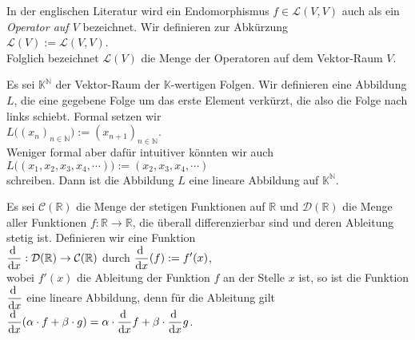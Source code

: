 In der englischen Literatur wird ein  Endomorphismus $f \in \mathcal{L}(V,V)$ auch als ein
{\emph{\color{blue}Operator auf $V$}} bezeichnet.  Wir definieren zur Abk\"{u}rzung
\\[0.2cm]
\hspace*{1.3cm}
$\mathcal{L}(V) := \mathcal{L}(V,V)$.
\\[0.2cm]
Folglich bezeichnet $\mathcal{L}(V)$ die Menge der Operatoren auf dem Vektor-Raum $V$.
\eoxs

\example
Es sei $\mathbb{K}^\mathbb{N}$ der Vektor-Raum der $\mathbb{K}$-wertigen Folgen.  Wir definieren
eine Abbildung $L$, die eine gegebene Folge um das erste Element verk\"{u}rzt, die also die Folge nach
links schiebt.  Formal setzen wir
\\[0.2cm]
\hspace*{1.3cm}
$L\bigl( (x_n)_{n\in \mathbb{N}} \bigr) := (x_{n+1})_{n\in\mathbb{N}}$.
\\[0.2cm]
Weniger formal aber daf\"{u}r intuitiver k\"{o}nnten wir auch
\\[0.2cm]
\hspace*{1.3cm}
$L\bigl( (x_1, x_2, x_3, x_4, \cdots) \bigr) := (x_2, x_3, x_4, \cdots)$
\\[0.2cm]
schreiben.  Dann ist die Abbildung $L$ eine lineare Abbildung auf $\mathbb{K}^\mathbb{N}$.
\eoxs

\example
Es sei $\mathcal{C}(\mathbb{R})$ die Menge der stetigen Funktionen auf $\mathbb{R}$ und $\mathcal{D}(\mathbb{R})$ die Menge aller Funktionen
$f:\mathbb{R} \rightarrow \mathbb{R}$, die \"{u}berall differenzierbar sind und deren Ableitung stetig ist.  Definieren wir eine Funktion
\\[0.2cm]
\hspace*{1.3cm}
$\displaystyle\frac{\mathrm{d}\;}{\mathrm{d}x}: \mathcal{D}(\mathbb{R}) \rightarrow \mathcal{C}(\mathbb{R})$ \quad durch $\displaystyle\frac{\mathrm{d}\;}{\mathrm{d}x}(f) := f'(x)$,
\\[0.2cm]
wobei $f'(x)$ die Ableitung der Funktion $f$ an der Stelle $x$ ist, so ist die Funktion $\displaystyle\frac{\mathrm{d}\;}{\mathrm{d}x}$ eine lineare Abbildung,
denn f\"{u}r die Ableitung gilt
\\[0.2cm]
\hspace*{1.3cm}
$\displaystyle\frac{\mathrm{d}\;}{\mathrm{d}x} (\alpha \cdot f + \beta \cdot g) = \alpha \cdot \frac{\mathrm{d}\;}{\mathrm{d}x} f + \beta \cdot \frac{\mathrm{d}\;}{\mathrm{d}x} g$. \eoxs


